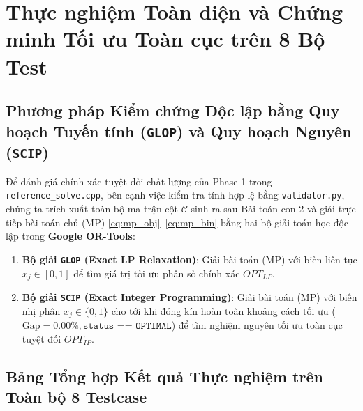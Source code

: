 \documentclass[11pt,a4paper]{article}
\theoremstyle{definition}
\begin{document}
\section{Thực nghiệm Toàn diện và Chứng minh Tối ưu Toàn cục trên 8 Bộ Test}

\subsection{Phương pháp Kiểm chứng Độc lập bằng Quy hoạch Tuyến tính (\texttt{GLOP}) và Quy hoạch Nguyên (\texttt{SCIP})}
Để đánh giá chính xác tuyệt đối chất lượng của Phase 1 trong \texttt{reference\_solve.cpp}, bên cạnh việc kiểm tra tính hợp lệ bằng \texttt{validator.py}, chúng ta trích xuất toàn bộ ma trận cột $\mathcal{C}$ sinh ra sau Bài toán con 2 và giải trực tiếp bài toán chủ (MP) \eqref{eq:mp_obj}--\eqref{eq:mp_bin} bằng hai bộ giải toán học độc lập trong \textbf{Google OR-Tools}:
\begin{enumerate}[leftmargin=1.5em]
    \item \textbf{Bộ giải \texttt{GLOP} (Exact LP Relaxation)}: Giải bài toán (MP) với biến liên tục $x_j \in [0, 1]$ để tìm giá trị tối ưu phân số chính xác $OPT_{LP}$.
    \item \textbf{Bộ giải \texttt{SCIP} (Exact Integer Programming)}: Giải bài toán (MP) với biến nhị phân $x_j \in \{0, 1\}$ cho tới khi đóng kín hoàn toàn khoảng cách tối ưu ($\text{Gap} = 0.00\%, \texttt{status == OPTIMAL}$) để tìm nghiệm nguyên tối ưu toàn cục tuyệt đối $OPT_{IP}$.
\end{enumerate}

\subsection{Bảng Tổng hợp Kết quả Thực nghiệm trên Toàn bộ 8 Testcase}
\end{document}
